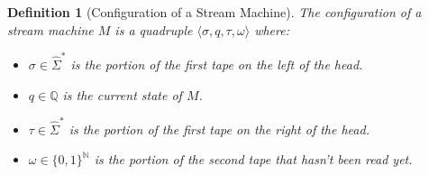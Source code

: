 \documentclass[10pt]{amsart}
\newcommand{\SFP}{\mathbf{SFP}}
\newcommand{\zero}{\mathtt{0}}
\newcommand{\one}{\mathtt{1}}
\newcommand{\NN}{\mathbb{N}}
\newcommand{\QQ}{\mathbb{Q}}
\newcommand{\ms}{q}
\newcommand{\msf}{q'}
\newcommand{\msi}[1]{q_{#1}}
\newcommand{\mc}{c}
\newcommand{\mcf}{c'}
\newcommand{\Sigmab}{\hat{\Sigma}}
\newcommand{\mcan}{M_{S}}
\newcommand{\genm}{\mcan\coloneqq \langle \QQ, \Sigma, \TT, \msi0 \rangle}
\newcommand{\mone}{M}
\newcommand{\sone}{\sigma}
\newcommand{\stwo}{\tau}
\newcommand{\oone}{\omega}
\newcommand{\mcnf}{\langle \sone, \ms, \stwo, \oone \rangle}
\newcommand{\rcs}[1]{\vdash_{#1}}
\newcommand{\TT}{\delta_\SFP}
\newtheorem{defn}{Definition}
\begin{document}
\begin{defn}[Configuration of a Stream Machine]
The configuration of a stream machine $\mone$ is a quadruple $\mcnf$ where:
\begin{itemize}
\item $\sone \in \Sigmab^*$ is the portion of the first tape on the left of the head.
\item $\ms \in \QQ$ is the current state of $\mone$.
\item $\stwo \in \Sigmab^*$ is the portion of the first tape on the right of the head.
\item $\oone \in \{0,1\}^\NN$ is the portion of the second tape that hasn't been read yet.
\end{itemize}
\end{defn}

\begin{comment}
\begin{defn}[Stream Machine Reachability relation]
Given a stream machine $\genm$, we define the transition relation $\rcs\TT$ between two configuration of $\mcan$ as the smallest relation closed by the following rules:
\begin{align*}
\langle \ms, \mc, \msf, \mcf, R, \epsilon \rangle \in \TT &\to \langle \sone, \ms, \mc \stwo, \oone\rangle \rcs\TT \langle \sone\mcf, \msf, \stwo, \oone\rangle\\
\langle \ms, \mc, \msf, \mcf, L, \epsilon \rangle \in \TT &\to \langle \sone \mc, \ms, \stwo, \oone\rangle \rcs\TT \langle \sone, \msf,\mcf \stwo, \oone\rangle\\
\langle \ms, \mc, \msf, \mcf, R, \zero \rangle \in \TT &\to \langle \sone, \ms, \mc \stwo, \zero\oone\rangle \rcs\TT \langle \sone\mcf, \msf, \stwo, \oone\rangle\\
\langle \ms, \mc, \msf, \mcf, L, \zero \rangle \in \TT &\to \langle \sone \mc, \ms, \stwo, \zero\oone\rangle \rcs\TT \langle \sone, \msf,\mcf \stwo, \oone\rangle\\
\langle \ms, \mc, \msf, \mcf, R, \one \rangle \in \TT &\to \langle \sone, \ms, \mc \stwo, \one\oone\rangle \rcs\TT \langle \sone\mcf, \msf, \stwo, \oone\rangle\\
\langle \ms, \mc, \msf, \mcf, L, \one \rangle \in \TT &\to \langle \sone \mc, \ms, \stwo, \one\oone\rangle \rcs\TT \langle \sone, \msf,\mcf \stwo, \oone\rangle\\
\end{align*}
\end{defn}
\end{comment}
\end{document}
